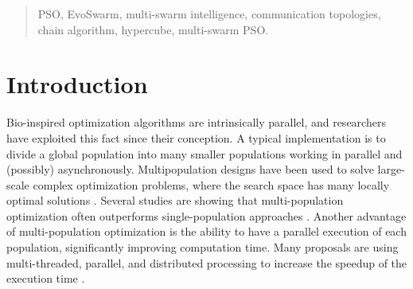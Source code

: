 \documentclass[runningheads]{llncs}
\newcommand{\keywords}[1]{\par\addvspace\baselineskip
\noindent\keywordname\enspace\ignorespaces#1}
\begin{document}
\begin{abstract}


\keywords{PSO, EvoSwarm, multi-swarm intelligence, communication topologies,
 chain algorithm, hypercube, multi-swarm PSO.}
\end{abstract}


\section{Introduction}


Bio-inspired optimization algorithms are intrinsically parallel, and researchers
have exploited this fact since their conception. A typical implementation is to
divide a global population into many smaller populations working in parallel and
(possibly) asynchronously. Multipopulation designs have been used to solve
large-scale complex optimization problems, where the search space has many
locally optimal solutions \cite{a1}. Several studies are showing that
multi-population optimization often outperforms single-population approaches
\cite{b11} \cite{b12}. Another advantage of multi-population optimization is the
ability to have a parallel execution of each population, significantly improving
computation time. Many proposals are using multi-threaded, parallel, and
distributed processing to increase the speedup of the execution time \cite{b13}
\cite{b14}.

\end{document}
